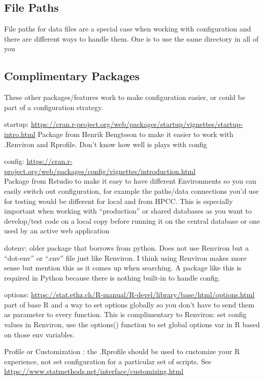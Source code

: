 \documentclass[
]{article}
\begin{document}
\hypertarget{file-paths}{%
\subsection{File Paths}\label{file-paths}}

File paths for data files are a special case when working with configuration and there are different ways to handle them. One is to use the same directory in all of you

\hypertarget{complimentary-packages}{%
\subsection{Complimentary Packages}\label{complimentary-packages}}

These other packages/features work to make configuration easier, or could be part of a configuration strategy.

startup: \url{https://cran.r-project.org/web/packages/startup/vignettes/startup-intro.html}
Package from Henrik Bengtsson to make it easier to work with .Renviron and Rprofile. Don't know how well is plays with config

config: \url{https://cran.r-project.org/web/packages/config/vignettes/introduction.html}\\
Package from Rstudio to make it easy to have different Environments so you can easily switch out configuration, for example the paths/data connections you'd use for testing would be different for local and from HPCC. This is especially important when working with ``production'' or shared databases as you want to develop/test code on a local copy before running it on the central database or one used by an active web application

dotenv: older package that borrows from python. Does not use Renviron but a ``dot-env'' or ``.env'' file just like Renviron. I think using Renviron makes more sense but mention this as it comes up when searching. A package like this is required in Python because there is nothing built-in to handle config.

options: \url{https://stat.ethz.ch/R-manual/R-devel/library/base/html/options.html}
part of base R and a way to set options globally so you don't have to send them as parameter to every function. This is complimentary to Renviron: set config values in Renviron, use the options() function to set global options var in R based on those env variables.

Profile or Customization : the .Rprofile should be used to customize your R experience, not set configuration for a particular set of scripts. See \url{https://www.statmethods.net/interface/customizing.html}
\end{document}
